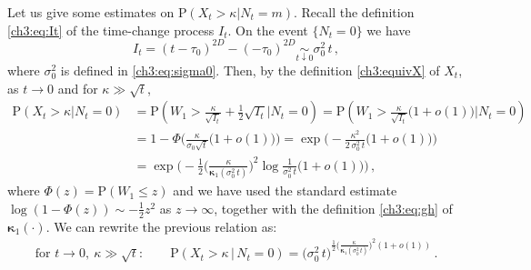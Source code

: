 \documentclass[a4paper,reqno,11pt]{amsart}
\numberwithin{equation}{section}
\newcommand{\PEfont}{\mathrm}
\renewcommand{\P}{\ensuremath{\PEfont P}}
\newcommand\bkappa{\boldsymbol{\kappa}}
\newcommand\blue{\color{blue}}
\begin{document}
Let us give some estimates on $\P(X_t>\kappa|N_t=m)$.
Recall the definition \eqref{ch3:eq:It} of the time-change process $I_t$.
On the event $\{N_t=0\}$ we have
\begin{equation*}
	I_t = (t-\tau_0)^{2D} - (-\tau_0)^{2D} \underset{t\downarrow 0}{\sim} \sigma_0^2 \, t \,,
\end{equation*}
where $\sigma_0^2$ is defined in \eqref{ch3:eq:sigma0}. Then,
by the definition \eqref{ch3:equivX} of $X_t$, 
as $t \to 0$ and for $\kappa \gg \sqrt{t}$,
\begin{equation*}
 \begin{split}
 \P(X_t>\kappa|N_t=0)
 &=\P\left(W_1 > \frac{\kappa}{\sqrt{I_t}} + \frac{1}{2} \sqrt{I_t} \bigg| N_t=0 \right) 
 = \P\left(W_1 > \frac{\kappa}{\sqrt{I_t}} \big(1+o(1)\big)\bigg| N_t=0 \right)  \\
 &= 1 - \Phi\bigg(
 \frac{\kappa}{\sigma_0\sqrt{t}}
  \big(1+o(1)\big) \bigg) 
 = \exp\bigg( - \frac{\kappa^2}{2 \, \sigma_0^2 \, t} \big(1+o(1)\big) \bigg) \\
  & = \exp\bigg( - \frac{1}{2} \bigg(\frac{\kappa}{\bkappa_1(\sigma_0^2 \, t)}\bigg)^2
	\log \frac{1}{ \sigma_0^2 \, t} \big(1+o(1)\big)\bigg)
	\,,
 \end{split}
\end{equation*}
where $\Phi(z) = \P(W_1 \le z)$ and
we have used the standard estimate $\log(1-\Phi(z)) \sim -\frac{1}{2}z^2$ as $z\to\infty$,
together with the definition \eqref{ch3:eq:gh} of $\bkappa_1(\cdot)$.
We can rewrite the previous relation as:
\begin{equation}\label{ch3:eq:Pevento0}
 \begin{split}
 \text{for } t \to 0, \ \kappa \gg \sqrt{t}: \qquad
 \P(X_t>\kappa \,|\, N_t=0)
 = \big( \sigma_0^2 \, t \big)^{ \frac{1}{2} \big(\frac{\kappa}
 {\bkappa_1(\sigma_0^2\, t)} \big)^2
	(1+o(1)) }
	\,.
 \end{split}
\end{equation}
\end{document}
